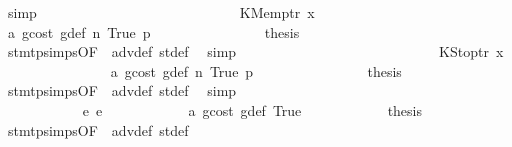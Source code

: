 \begin{isabellebody}
\ simp\isanewline
\ \ \ \ \ \ \ \ \ \ \ \ \isamarkupfalse%
\isanewline
\ \ \ \ \ \ \ \ \ \ \ \ \ \ \isamarkupfalse%
\ {\isacharparenleft}{\kern0pt}KMemptr\ x{}{\isacharparenright}{\kern0pt}\isanewline
\ \ \ \ \ \ \ \ \ \ \ \ \ \ \isamarkupfalse%
\ a{}\ gcost\ g{\isacharunderscore}{\kern0pt}def\ n{}\ True\ p{}\isanewline
\ \ \ \ \ \ \ \ \ \ \ \ \ \ \isamarkupfalse%
\ {\isacharquery}{\kern0pt}thesis\ \isamarkupfalse%
\ stmt{\isachardot}{\kern0pt}psimps{\isacharparenleft}{\kern0pt}{}{}{\isacharparenright}{\kern0pt}{\isacharbrackleft}{\kern0pt}OF\ {}{}{\isacharparenleft}{\kern0pt}{}{\isacharparenright}{\kern0pt}{\isacharbrackright}{\kern0pt}\ adv{\isacharunderscore}{\kern0pt}def\ st{\isacharprime}{\kern0pt}{\isacharunderscore}{\kern0pt}def\ \isamarkupfalse%
\ simp\isanewline
\ \ \ \ \ \ \ \ \ \ \ \ \isamarkupfalse%
\isanewline
\ \ \ \ \ \ \ \ \ \ \ \ \ \ \isamarkupfalse%
\ {\isacharparenleft}{\kern0pt}KStoptr\ x{}{\isacharparenright}{\kern0pt}\isanewline
\ \ \ \ \ \ \ \ \ \ \ \ \ \ \isamarkupfalse%
\ a{}\ gcost\ g{\isacharunderscore}{\kern0pt}def\ n{}\ True\ p{}\isanewline
\ \ \ \ \ \ \ \ \ \ \ \ \ \ \isamarkupfalse%
\ {\isacharquery}{\kern0pt}thesis\ \isamarkupfalse%
\ stmt{\isachardot}{\kern0pt}psimps{\isacharparenleft}{\kern0pt}{}{}{\isacharparenright}{\kern0pt}{\isacharbrackleft}{\kern0pt}OF\ {}{}{\isacharparenleft}{\kern0pt}{}{\isacharparenright}{\kern0pt}{\isacharbrackright}{\kern0pt}\ adv{\isacharunderscore}{\kern0pt}def\ st{\isacharprime}{\kern0pt}{\isacharunderscore}{\kern0pt}def\ \isamarkupfalse%
\ simp\isanewline
\ \ \ \ \ \ \ \ \ \ \ \ \isamarkupfalse%
\isanewline
\ \ \ \ \ \ \ \ \ \ \isamarkupfalse%
\isanewline
\ \ \ \ \ \ \ \ \isamarkupfalse%
\isanewline
\ \ \ \ \ \ \ \ \ \ \isamarkupfalse%
\ {\isacharparenleft}{\kern0pt}e\ e{\isacharparenright}{\kern0pt}\isanewline
\ \ \ \ \ \ \ \ \ \ \isamarkupfalse%
\ a{}\ gcost\ g{\isacharunderscore}{\kern0pt}def\ True\isanewline
\ \ \ \ \ \ \ \ \ \ \isamarkupfalse%
\ {\isacharquery}{\kern0pt}thesis\ \isamarkupfalse%
\ stmt{\isachardot}{\kern0pt}psimps{\isacharparenleft}{\kern0pt}{}{}{\isacharparenright}{\kern0pt}{\isacharbrackleft}{\kern0pt}OF\ {}{}{\isacharparenleft}{\kern0pt}{}{\isacharparenright}{\kern0pt}{\isacharbrackright}{\kern0pt}\ adv{\isacharunderscore}{\kern0pt}def\ st{\isacharprime}{\kern0pt}{\isacharunderscore}{\kern0pt}def\ \isamarkupfalse%

\end{isabellebody}
